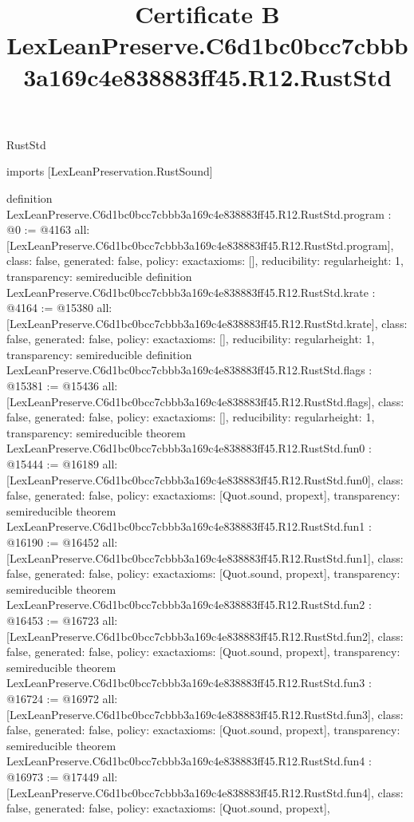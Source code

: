 \begin{lexlean}{RustStd}
\title{Certificate B LexLeanPreserve.C6d1bc0bcc7cbbb3a169c4e838883ff45.R12.RustStd}
\begin{coremodule}
imports [LexLeanPreservation.RustSound]

definition LexLeanPreserve.C6d1bc0bcc7cbbb3a169c4e838883ff45.R12.RustStd.program : @0 := @4163 {
  all: [LexLeanPreserve.C6d1bc0bcc7cbbb3a169c4e838883ff45.R12.RustStd.program],
  class: false,
  generated: false,
  policy: exact{axioms: []},
  reducibility: regular{height: 1},
  transparency: semireducible
}
definition LexLeanPreserve.C6d1bc0bcc7cbbb3a169c4e838883ff45.R12.RustStd.krate : @4164 := @15380 {
  all: [LexLeanPreserve.C6d1bc0bcc7cbbb3a169c4e838883ff45.R12.RustStd.krate],
  class: false,
  generated: false,
  policy: exact{axioms: []},
  reducibility: regular{height: 1},
  transparency: semireducible
}
definition LexLeanPreserve.C6d1bc0bcc7cbbb3a169c4e838883ff45.R12.RustStd.flags : @15381 := @15436 {
  all: [LexLeanPreserve.C6d1bc0bcc7cbbb3a169c4e838883ff45.R12.RustStd.flags],
  class: false,
  generated: false,
  policy: exact{axioms: []},
  reducibility: regular{height: 1},
  transparency: semireducible
}
theorem LexLeanPreserve.C6d1bc0bcc7cbbb3a169c4e838883ff45.R12.RustStd.fun0 : @15444 := @16189 {
  all: [LexLeanPreserve.C6d1bc0bcc7cbbb3a169c4e838883ff45.R12.RustStd.fun0],
  class: false,
  generated: false,
  policy: exact{axioms: [Quot.sound, propext]},
  transparency: semireducible
}
theorem LexLeanPreserve.C6d1bc0bcc7cbbb3a169c4e838883ff45.R12.RustStd.fun1 : @16190 := @16452 {
  all: [LexLeanPreserve.C6d1bc0bcc7cbbb3a169c4e838883ff45.R12.RustStd.fun1],
  class: false,
  generated: false,
  policy: exact{axioms: [Quot.sound, propext]},
  transparency: semireducible
}
theorem LexLeanPreserve.C6d1bc0bcc7cbbb3a169c4e838883ff45.R12.RustStd.fun2 : @16453 := @16723 {
  all: [LexLeanPreserve.C6d1bc0bcc7cbbb3a169c4e838883ff45.R12.RustStd.fun2],
  class: false,
  generated: false,
  policy: exact{axioms: [Quot.sound, propext]},
  transparency: semireducible
}
theorem LexLeanPreserve.C6d1bc0bcc7cbbb3a169c4e838883ff45.R12.RustStd.fun3 : @16724 := @16972 {
  all: [LexLeanPreserve.C6d1bc0bcc7cbbb3a169c4e838883ff45.R12.RustStd.fun3],
  class: false,
  generated: false,
  policy: exact{axioms: [Quot.sound, propext]},
  transparency: semireducible
}
theorem LexLeanPreserve.C6d1bc0bcc7cbbb3a169c4e838883ff45.R12.RustStd.fun4 : @16973 := @17449 {
  all: [LexLeanPreserve.C6d1bc0bcc7cbbb3a169c4e838883ff45.R12.RustStd.fun4],
  class: false,
  generated: false,
  policy: exact{axioms: [Quot.sound, propext]},
}
\end{coremodule}
\end{lexlean}
